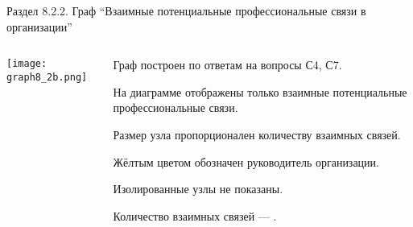 \begin{frame}{Раздел 8.2.2. Граф ``Взаимные потенциальные профессиональные связи в организации''}

\begin{columns} 
\begin{column}{0.75\textwidth}
\centering
          \texttt{[image: graph8\_2b.png]}
\end{column}
\begin{column}{0.25\textwidth} 

\tiny
Граф  построен по ответам на вопросы С4, С7.
\smallskip

На диаграмме отображены только взаимные потенциальные профессиональные связи.
\smallskip

Размер узла пропорционален количеству взаимных связей.
\smallskip

Жёлтым цветом обозначен руководитель организации.
\smallskip

Изолированные узлы не показаны.
\bigskip

Количество взаимных связей --- \valHBBlinks.


\end{column}
\end{columns}
\end{frame}


